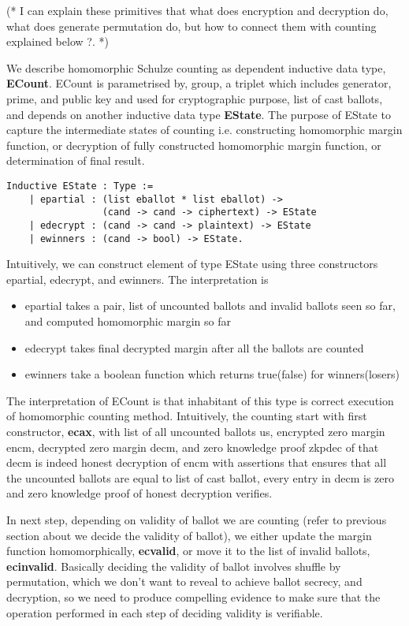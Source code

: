 \documentclass{llncs}
\begin{document}
(* I can explain these primitives that what does encryption and decryption 
do, what does generate permutation do,  but how to connect them with 
   counting explained below ?. *) 

We describe homomorphic Schulze counting as dependent inductive data type,
\textbf{ECount}. ECount is parametrised by, group, a triplet which includes 
generator, prime, and public key and used 
for cryptographic purpose, list of cast ballots, and depends on another 
inductive data type \textbf{EState}. 
The purpose of EState to capture the intermediate states 
of counting i.e. constructing homomorphic margin function, or 
decryption of fully constructed homomorphic margin function, or 
determination of final result. 

\begin{verbatim}
Inductive EState : Type :=
    | epartial : (list eballot * list eballot) ->
                 (cand -> cand -> ciphertext) -> EState
    | edecrypt : (cand -> cand -> plaintext) -> EState
    | ewinners : (cand -> bool) -> EState.
\end{verbatim}

Intuitively, we can construct element of type EState using three constructors 
epartial, edecrypt, and ewinners. The interpretation is 
\begin{itemize}
 \item epartial takes a pair, list of uncounted ballots and invalid ballots seen 
       so far, and computed homomorphic margin so far
 \item edecrypt takes final decrypted margin after all the ballots are counted
 \item ewinners take a boolean function which returns true(false) for winners(losers)
\end{itemize}

The interpretation of ECount is that inhabitant of this type is correct 
execution of homomorphic counting method. Intuitively, the counting 
start with first constructor, \textbf{ecax}, with list of all 
uncounted ballots us, encrypted zero margin encm, decrypted zero margin 
decm, and zero knowledge proof zkpdec of that decm is indeed honest decryption
of encm with assertions that ensures that all the uncounted ballots are 
equal to list of cast ballot, every entry in decm is zero and 
zero knowledge proof of honest decryption verifies. 


In next step, depending on validity of ballot we are counting (refer to 
previous section about we decide the validity of ballot), we either update the 
margin function homomorphically, \textbf{ecvalid}, or move it to the 
list of invalid ballots, \textbf{ecinvalid}. Basically deciding 
the validity of ballot involves shuffle by permutation, which
we don't want to reveal to achieve ballot secrecy, and decryption, so 
we need to produce compelling evidence 
to make sure that the operation performed in each step of deciding validity 
is verifiable. 
\end{document}
